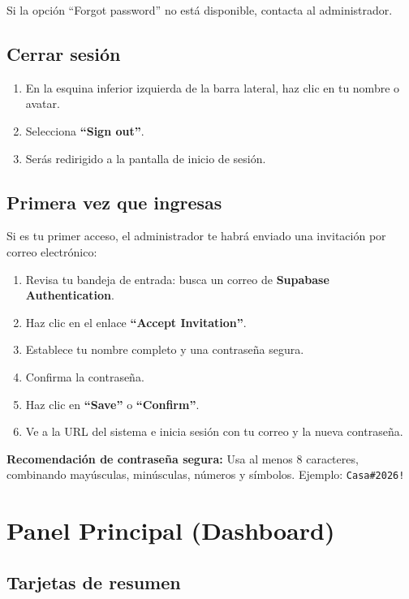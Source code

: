 \documentclass[12pt,oneside]{article}
\begin{document}
\noindent Si la opción “Forgot password” no está disponible, contacta al administrador.

\subsection{Cerrar sesión}

\begin{enumerate}[leftmargin=*]
  \item En la esquina inferior izquierda de la barra lateral, haz clic en tu nombre o avatar.
  \item Selecciona \textbf{“Sign out”}.
  \item Serás redirigido a la pantalla de inicio de sesión.
\end{enumerate}

\subsection{Primera vez que ingresas}

Si es tu primer acceso, el administrador te habrá enviado una invitación por correo electrónico:

\begin{enumerate}[leftmargin=*]
  \item Revisa tu bandeja de entrada: busca un correo de \textbf{Supabase Authentication}.
  \item Haz clic en el enlace \textbf{“Accept Invitation”}.
  \item Establece tu nombre completo y una contraseña segura.
  \item Confirma la contraseña.
  \item Haz clic en \textbf{“Save”} o \textbf{“Confirm”}.
  \item Ve a la URL del sistema e inicia sesión con tu correo y la nueva contraseña.
\end{enumerate}

\noindent\textbf{Recomendación de contraseña segura:} Usa al menos 8 caracteres, combinando mayúsculas, minúsculas, números y símbolos. Ejemplo: \texttt{Casa\#2026!}

\section{Panel Principal (Dashboard)}

\subsection{Tarjetas de resumen}
\end{document}
